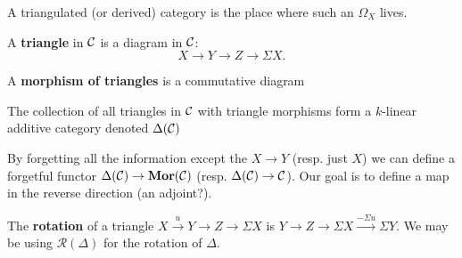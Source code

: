 \documentclass[12pt]{article}
\begin{document}
A triangulated (or derived) category is the place where such an $\Omega_X$ lives.
\begin{defn}
	A \textbf{triangle} in $\cal C$ is a diagram in $\cal C$:
	\[X\to Y\to Z\to\Sigma X.\]
\end{defn}
\begin{defn}
	A \textbf{morphism of triangles} is a commutative diagram
	\begin{center}
	\end{center}
\end{defn}
\begin{lem}
	The collection of all triangles in $\cal C$ with triangle morphisms form a $k$-linear additive category denoted $\Delta(\cal C)$
\end{lem}
\begin{rmk}
	By forgetting all the information except the $X\to Y$ (resp. just $X$) we can define a forgetful
	functor $\Delta(\cal C)\to\mathbf{Mor}(\cal C)$ (resp. $\Delta(\cal C)\to\cal C$). Our goal is to define a map in 
	the reverse direction (an adjoint?).
\end{rmk}
\begin{defn}
	The \textbf{rotation} of a triangle $X\xrightarrow{u} Y\to Z\to \Sigma X$ is $Y\to Z\to \Sigma X\xrightarrow{-\Sigma u}\Sigma Y.$
	We may be using $\mathscr R(\Delta)$ for the rotation of $\Delta$.
\end{defn}
\end{document}
